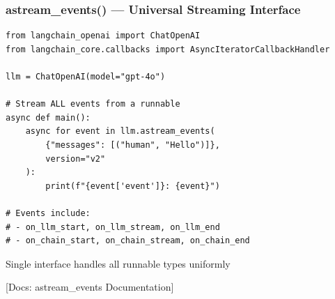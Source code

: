 \documentclass[aspectratio=169,11pt]{beamer}
\newcommand{\docref}[1]{{\scriptsize\color{docgray}[Docs: #1]}}
\begin{document}

\begin{frame}[fragile]
  \frametitle{astream\_events() — Universal Streaming Interface}

  \begin{lstlisting}
from langchain_openai import ChatOpenAI
from langchain_core.callbacks import AsyncIteratorCallbackHandler

llm = ChatOpenAI(model="gpt-4o")

# Stream ALL events from a runnable
async def main():
    async for event in llm.astream_events(
        {"messages": [("human", "Hello")]},
        version="v2"
    ):
        print(f"{event['event']}: {event}")

# Events include:
# - on_llm_start, on_llm_stream, on_llm_end
# - on_chain_start, on_chain_stream, on_chain_end
  \end{lstlisting}

  \vspace{0.1cm}

  \begin{tipbox}[Advantage]
    Single interface handles all runnable types uniformly
  \end{tipbox}

  \docref{astream\_events Documentation}
\end{frame}

\end{document}
